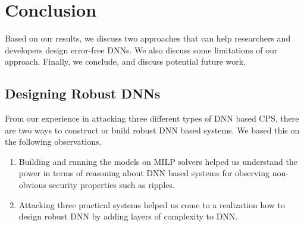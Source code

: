\chapter{Conclusion}
\label{conclusion}


Based on our results, we discuss two approaches that can help researchers and developers design error-free \ac{DNN}s. 
We also discuss some limitations of our approach.
Finally, we conclude, and discuss potential future work.


\section{Designing Robust DNNs}
From our experience in attacking three different types of \ac{DNN} based CPS, there are two ways to construct or build robust \ac{DNN} based systems.
We based this on the following observations.  
\begin{enumerate}
	\item Building and running the models on \ac{MILP} solvers helped us understand the power in terms of reasoning about \ac{DNN} based systems for observing non-obvious security properties such as ripples. 
	\item Attacking three practical systems helped  us come to a realization how to design robust \ac{DNN}  by adding layers of complexity to \ac{DNN}. 
\end{enumerate}


